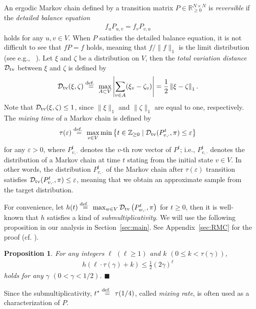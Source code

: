 \documentclass[letter, 11pt]{article}
\newcommand{\defeq}{\stackrel{\mbox{\scriptsize{\normalfont\rmfamily def. }}}{=}}
\newcommand{\shortqed}{\hfill \mbox{$\blacksquare$} \smallskip}
\newcommand{\1}{\mbox{1}\hspace{-0.25em}\mbox{l}}
\newtheorem{proposition}[theorem]{Proposition}
\begin{document}
An ergodic Markov chain defined by a transition matrix $P \in \mathbb{R}_{\geq 0}^{N \times N}$ is {\em reversible} 
  if the {\em detailed balance equation} 
\begin{eqnarray}\label{eq:db}
  f_u P_{u, v} = f_v P_{v, u}
\end{eqnarray}
  holds for any $u, v \in V$. 
 When $P$ satisfies the detailed balance equation, 
  it is not difficult to see that $fP=f$ holds, 
  meaning that $f/\|f\|_1$ is the limit distribution (see e.g., ~\cite{LPW08}). 
Let $\xi$ and $\zeta$ be a distribution on $V$, 
then the {\em total variation distance} ${\cal D}_{\rm tv}$ between $\xi$ and $\zeta$ is defined  by  
\begin{eqnarray}
\label{def:TV}
\dtv(\xi, \zeta)
\defeq \max_{A\subset V} \left| \sum_{v\in A}(\xi_v-\zeta_v )\right|
=\frac{1}{2} \left\|\xi-\zeta\right\|_1. 
\label{def:dtv}
\end{eqnarray}
 Note that ${\cal D}_{\rm tv}(\xi, \zeta) \leq 1$, since $\|\xi\|_1$ and $\|\zeta\|_1$ are equal to one, respectively. 
The {\em mixing time} of a Markov chain is defined by 
\begin{eqnarray}
 \tau(\varepsilon) \defeq 
 \max_{v \in V} \min \left\{ t \in \mathbb{Z}_{\geq 0} \mid \dtv(P^t_{v, \cdot}, \pi) \leq \varepsilon \right\}
\label{def:mix}
\end{eqnarray}
 for any $\varepsilon > 0$, 
  where  $P^t_{v, \cdot}$ denotes the $v$-th row vector of $P^t$; 
  i.e., $P^t_{v, \cdot}$ denotes the distribution of 
   a Markov chain at time $t$ 
   stating from the initial state $v \in V$. 
In other words, 
   the distribution $P^t_{v, \cdot}$ of the Markov chain after $\tau(\varepsilon)$ transition 
   satisfies ${\cal D}_{\rm tv}(P^t_{v, \cdot}, \pi) \leq \varepsilon$, 
  meaning that we obtain an approximate sample from the target distribution. 

For convenience, let
 $h(t) \defeq \max_{w\in V}\dtv\left( P^t_{w, \cdot}, \pi \right)$ 
 for $t \geq 0$, then 
 it is well-known that 
  $h$ satisfies a kind of {\em submultiplicativity}. 
 We will use the following proposition in our analysis in Section~\ref{sec:main}. 
 See Appendix~\ref{sec:RMC} for the proof (cf. \cite{LPW08,MT06}). 
\begin{proposition}\label{prop:dltimes}
  For any integers $\ell$  $(\ell\geq 1)$ and 
  $k$ $(0 \leq k < \tau(\gamma))$, 
\begin{eqnarray*}
h \left(\ell \cdotp \tau(\gamma)+k \right)\leq \frac{1}{2}(2\gamma )^\ell
\end{eqnarray*}
 holds for any $\gamma$ $(0<\gamma<1/2)$. 
\shortqed
\end{proposition} 
Since the submultiplicativity, $t^* \defeq \tau(1/4)$, called {\em mixing rate}, is often used as a characterization of $P$. 
\end{document}
